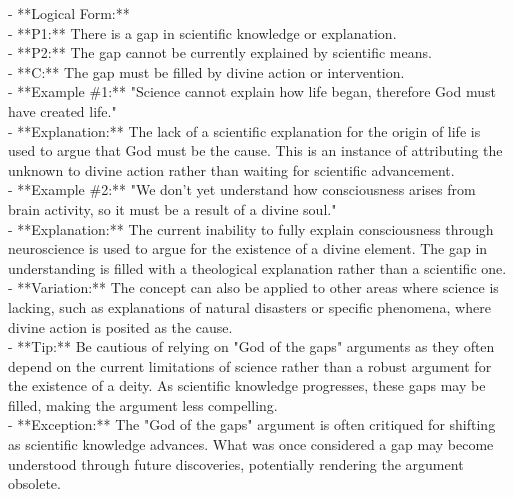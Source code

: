 \documentclass[a4paper,12pt,single,pdftex]{scrartcl}
\begin{document}
    
      - **Logical Form:**
    \\

    
        - **P1:** There is a gap in scientific knowledge or explanation.
    \\

    
        - **P2:** The gap cannot be currently explained by scientific means.
    \\

    
        - **C:** The gap must be filled by divine action or intervention.
    \\

    
      - **Example \#1:** "Science cannot explain how life began, therefore God must have created life."
    \\

    
      - **Explanation:** The lack of a scientific explanation for the origin of life is used to argue that God must be the cause. This is an instance of attributing the unknown to divine action rather than waiting for scientific advancement.
    \\

    
      - **Example \#2:** "We don’t yet understand how consciousness arises from brain activity, so it must be a result of a divine soul."
    \\

    
      - **Explanation:** The current inability to fully explain consciousness through neuroscience is used to argue for the existence of a divine element. The gap in understanding is filled with a theological explanation rather than a scientific one.
    \\

    
      - **Variation:** The concept can also be applied to other areas where science is lacking, such as explanations of natural disasters or specific phenomena, where divine action is posited as the cause.
    \\

    
      - **Tip:** Be cautious of relying on "God of the gaps" arguments as they often depend on the current limitations of science rather than a robust argument for the existence of a deity. As scientific knowledge progresses, these gaps may be filled, making the argument less compelling.
    \\

    
      - **Exception:** The "God of the gaps" argument is often critiqued for shifting as scientific knowledge advances. What was once considered a gap may become understood through future discoveries, potentially rendering the argument obsolete.
    \\
\end{document}
